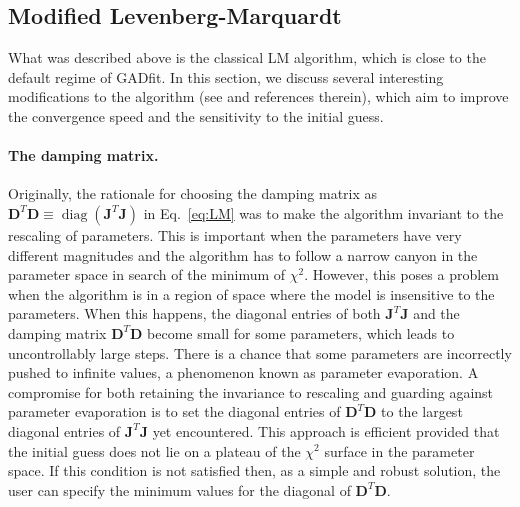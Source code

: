 \documentclass{article}
\DeclareMathOperator{\diag}{diag}
\begin{document}
\subsection{\label{sec:mod_lm}Modified Levenberg-Marquardt}

What was described above is the classical LM algorithm, which is close to the default regime of GADfit. In this section, we discuss several interesting modifications to the algorithm (see \cite{transtrum10, transtrum11, transtrum12} and references therein), which aim to improve the convergence speed and the sensitivity to the initial guess.

\paragraph{The damping matrix.} Originally, the rationale for choosing the damping matrix as $\bm D^T\bm D \equiv \diag(\bm J^T\bm J)$ in Eq.~\eqref{eq:LM} was to make the algorithm invariant to the rescaling of parameters. This is important when the parameters have very different magnitudes and the algorithm has to follow a narrow canyon in the parameter space in search of the minimum of $\chi^2$. However, this poses a problem when the algorithm is in a region of space where the model is insensitive to the parameters. When this happens, the diagonal entries of both $\bm J^T\bm J$ and the damping matrix $\bm D^T\bm D$ become small for some parameters, which leads to uncontrollably large steps. There is a chance that some parameters are incorrectly pushed to infinite values, a phenomenon known as parameter evaporation. A compromise for both retaining the invariance to rescaling and guarding against parameter evaporation is to set the diagonal entries of $\bm D^T\bm D$ to the largest diagonal entries of $\bm J^T\bm J$ yet encountered. This approach is efficient provided that the initial guess does not lie on a plateau of the $\chi^2$ surface in the parameter space. If this condition is not satisfied then, as a simple and robust solution, the user can specify the minimum values for the diagonal of $\bm D^T\bm D$.
\end{document}
